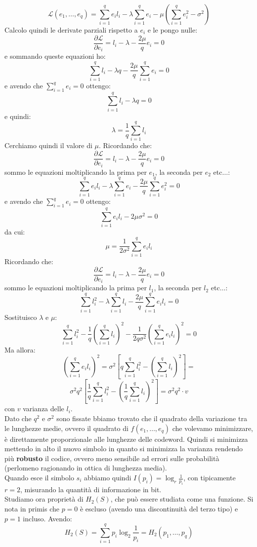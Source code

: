 \documentclass[a4paper,12pt, oneside]{book}
\begin{document}
\[\mathcal{L}(e_1,\ldots,e_q)=\sum_{i=1}^qe_il_i-\lambda\sum_{i=1}^q
  e_i-\mu\left(\sum_{i=1}^q e_i^2-\sigma^2\right)\] 
Calcolo quindi le derivate parziali rispetto a $e_i$ e le pongo nulle:
\[\frac{\partial\mathcal{L}}{\partial e_i}=l_i-\lambda-\frac{2\mu}{q}e_i=0\]
e sommando queste equazioni ho:
\[\sum_{i=1}^q l_i-\lambda q-\frac{2\mu}{q}\sum_{i=1}^q e_i=0\]
e avendo che $\sum_{i=1}^qe_i=0$ ottengo:
\[\sum_{i=1}^q l_i-\lambda q=0\]
e quindi:
\[\lambda=\frac{1}{q}\sum_{i=1}^q l_i\]
Cerchiamo quindi il valore di $\mu$.
Ricordando che:
\[\frac{\partial\mathcal{L}}{\partial e_i}=l_i-\lambda-\frac{2\mu}{q}e_i=0\]
sommo le equazioni moltiplicando la prima per $e_1$, la seconda per $e_2 $
etc$\ldots$:
\[\sum_{i=1}^q e_il_i-\lambda \sum_{i=1}^q e_i-\frac{2\mu}{q}\sum_{i=1}^q e_i^2=0\]
e avendo che $\sum_{i=1}^qe_i=0$ ottengo:
\[\sum_{i=1}^q e_il_i-2\mu\sigma^2=0\]
da cui:
\[\mu=\frac{1}{2\sigma^2}\sum_{i=1}^qe_il_i\]
Ricordando che:
\[\frac{\partial\mathcal{L}}{\partial e_i}=l_i-\lambda-\frac{2\mu}{q}e_i=0\]
sommo le equazioni moltiplicando la prima per $l_1$, la seconda per $l_2 $
etc$\ldots$:
\[\sum_{i=1}^q l_i^2-\lambda \sum_{i=1}^q l_i-\frac{2\mu}{q}\sum_{i=1}^q
  e_il_i=0\]
Sostituisco $\lambda$ e $\mu$:
\[\sum_{i=1}^q l_i^2- \frac{1}{q}\left(\sum_{i=1}^q l_i\right)^2-
  \frac{1}{2q\sigma^2}\left(\sum_{i=1}^qe_il_i\right)^2=0\]
Ma allora:
\[\left(\sum_{i=1}^qe_il_i\right)^2=\sigma^2\left[q\sum_{i=1}^q
    l_i^2-\left(\sum_{i=1}^q
      l_i\right)^2\right]=\]
\[\sigma^2q^2\left[\frac{1}{q}\sum_{i=1}^q
    l_i^2-\left(\frac{1}{q}\sum_{i=1}^q l_i\right)^2\right]=\sigma^2q^2\cdot v\]
con $v$ varianza delle $l_i$.\\
Dato che $q^2$ e $\sigma^2$ sono fissate bbiamo trovato che il quadrato della
variazione tra le lunghezze medie, ovvero il quadrato di $f(e_1,\ldots,e_q)$ che
volevamo minimizzare, è direttamente proporzionale alle lunghezze delle
codeword. Quindi si minimizza mettendo in alto il nuovo simbolo in quanto si
minimizza la varianza rendendo più \textbf{robusto} il codice, ovvero meno
sensibile ad errori sulle probabilità (perlomeno ragionando in ottica di
lunghezza media).\\
Quando esce il simbolo $s_i$ abbiamo quindi $I(p_i)=\log_r \frac{1}{p_i}$, con
tipicamente $r=2$, misurando la quantità di informazione in bit.\\
Studiamo ora proprietà di $H_2(S)$, che può essere studiata come una
funzione. Si nota in primis che $p=0$ è escluso (avendo una discontinuità del
terzo tipo) e $p=1$ incluso. Avendo:
\[H_2(S)=\sum_{i=1}^q p_i\log_2\frac{1}{p_i}=H_2(p_1,\ldots, p_q)\]
\end{document}
